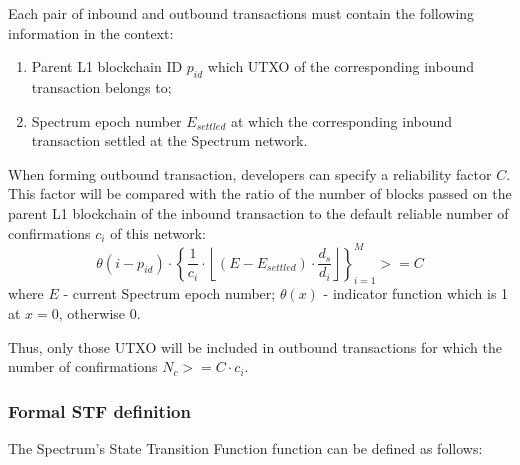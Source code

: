 \documentclass{article}
\begin{document}
    Each pair of inbound and outbound transactions must contain the following information in the context:
    \begin{enumerate}
        \item Parent L1 blockchain ID $p_{id}$ which UTXO of the corresponding inbound transaction belongs to;
        \item Spectrum epoch number $E_{settled}$ at which the corresponding inbound transaction settled at the Spectrum network.
    \end{enumerate}
    When forming outbound transaction, developers can specify a reliability factor $C$. This factor will be compared with the ratio of the number of blocks passed on the parent L1 blockchain of the inbound transaction to the default reliable number of confirmations $c_i$ of this network:
    \begin{equation}
        \theta(i-p_{id})\cdot \left\{\frac{1}{c_i} \cdot \left\lfloor (E-E_{settled}) \cdot \frac{d_s}{d_i}\right\rfloor\right\}_{i=1}^{M} >= C\label{eq:equation6}
    \end{equation}
    where $E$ - current Spectrum epoch number; $\theta(x)$ - indicator function which is 1 at $x = 0$, otherwise 0.


    Thus, only those UTXO will be included in outbound transactions for which the number of confirmations $N_c>=C\cdot c_i$.

    \subsubsection{Formal STF definition}
    The Spectrum's State Transition Function function can be defined as follows:
\end{document}
